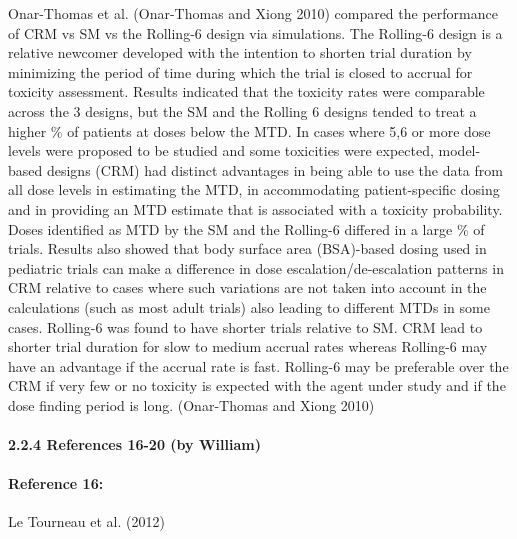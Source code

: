 \documentclass[
]{article}
\begin{document}
Onar-Thomas et al. (Onar-Thomas and Xiong 2010) compared the performance
of CRM vs SM vs the Rolling-6 design via simulations. The Rolling-6
design is a relative newcomer developed with the intention to shorten
trial duration by minimizing the period of time during which the trial
is closed to accrual for toxicity assessment. Results indicated that the
toxicity rates were comparable across the 3 designs, but the SM and the
Rolling 6 designs tended to treat a higher \% of patients at doses below
the MTD. In cases where 5,6 or more dose levels were proposed to be
studied and some toxicities were expected, model-based designs (CRM) had
distinct advantages in being able to use the data from all dose levels
in estimating the MTD, in accommodating patient-specific dosing and in
providing an MTD estimate that is associated with a toxicity
probability. Doses identified as MTD by the SM and the Rolling-6
differed in a large \% of trials. Results also showed that body surface
area (BSA)-based dosing used in pediatric trials can make a difference
in dose escalation/de-escalation patterns in CRM relative to cases where
such variations are not taken into account in the calculations (such as
most adult trials) also leading to different MTDs in some cases.
Rolling-6 was found to have shorter trials relative to SM. CRM lead to
shorter trial duration for slow to medium accrual rates whereas
Rolling-6 may have an advantage if the accrual rate is fast. Rolling-6
may be preferable over the CRM if very few or no toxicity is expected
with the agent under study and if the dose finding period is long.
(Onar-Thomas and Xiong 2010)

\hypertarget{references-16-20-by-william}{%
\paragraph{2.2.4 References 16-20 (by
William)}\label{references-16-20-by-william}}

\hypertarget{reference-16}{%
\paragraph{Reference 16:}\label{reference-16}}

Le Tourneau et al. (2012)
\end{document}
